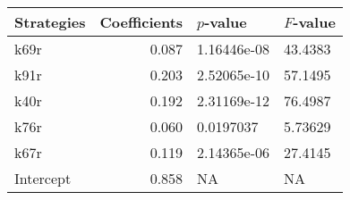 \begin{tabular}{lrll}
\toprule
Strategies &  Coefficients &    $p$-value & $F$-value \\
\midrule
      k69r &         0.087 &  1.16446e-08 &   43.4383 \\
      k91r &         0.203 &  2.52065e-10 &   57.1495 \\
      k40r &         0.192 &  2.31169e-12 &   76.4987 \\
      k76r &         0.060 &    0.0197037 &   5.73629 \\
      k67r &         0.119 &  2.14365e-06 &   27.4145 \\
 Intercept &         0.858 &           NA &        NA \\
\bottomrule
\end{tabular}
